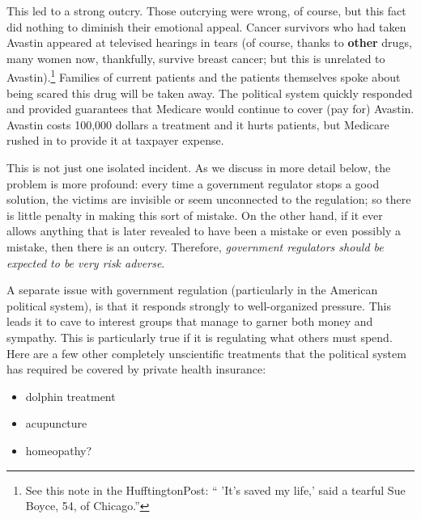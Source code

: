 This led to a strong outcry. Those outcrying were wrong, of course, but this
fact did nothing to diminish their emotional appeal. Cancer survivors who had
taken Avastin appeared at televised hearings in tears (of course, thanks to
\textbf{other} drugs, many women now, thankfully, survive breast cancer; but
this is unrelated to Avastin).\footnote{See this note in the HufftingtonPost:
`` 'It's saved my life,' said a tearful Sue Boyce, 54, of Chicago.''}
Families of current patients and the patients themselves spoke about being
scared this drug will be taken away. The political system quickly responded and
provided guarantees that Medicare would continue to cover (pay for) Avastin.
Avastin costs 100,000 dollars a treatment and it hurts patients, but Medicare
rushed in to provide it at taxpayer expense.

This is not just one isolated incident. As we discuss in more detail below, the
problem is more profound: every time a government regulator stops a good
solution, the victims are invisible or seem unconnected to the regulation; so
there is little penalty in making this sort of mistake. On the other hand, if
it ever allows anything that is later revealed to have been a mistake or even
possibly a mistake, then there is an outcry. Therefore, \emph{government
regulators should be expected to be very risk adverse}.

A separate issue with government regulation (particularly in the American
political system), is that it responds strongly to well-organized pressure.
This leads it to cave to interest groups that manage to garner both money and
sympathy. This is particularly true if it is regulating what others must spend.
Here are a few other completely unscientific treatments that the political
system has required be covered by private health insurance:

\begin{itemize}
\item dolphin treatment
\item acupuncture
\item homeopathy?
\end{itemize}


